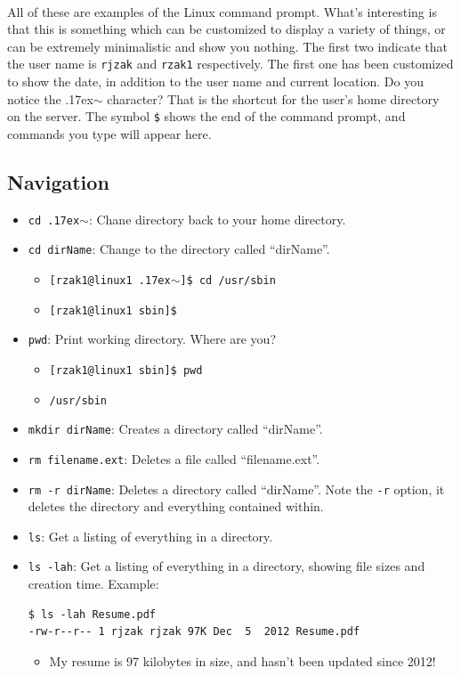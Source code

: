 \documentclass[letter,11pt]{article}
\begin{document}
\paragraph{}All of these are examples of the Linux command prompt. What's interesting is that this is something which can be customized to display a variety of things, or can be extremely minimalistic and show you nothing. The first two indicate that the user name is \texttt{rjzak} and \texttt{rzak1} respectively. The first one has been customized to show the date, in addition to the user name and current location. Do you notice the {\raise.17ex\hbox{$\scriptstyle\sim$}} character? That is the shortcut for the user's home directory on the server. The symbol \texttt{\$} shows the end of the command prompt, and commands you type will appear here.

\subsection{Navigation}
\begin{itemize}
    \item \texttt{cd {\raise.17ex\hbox{$\scriptstyle\sim$}}}: Chane directory back to your home directory.
    \item \texttt{cd dirName}: Change to the directory called ``dirName''.
    \begin{itemize}
        \item \texttt{[rzak1@linux1 {\raise.17ex\hbox{$\scriptstyle\sim$}}]\$ cd /usr/sbin}
        \item \texttt{[rzak1@linux1 sbin]\$}
    \end{itemize}
    \item \texttt{pwd}: Print working directory. Where are you?
    \begin{itemize}
        \item \texttt{[rzak1@linux1 sbin]\$ pwd}
        \item \texttt{/usr/sbin}
    \end{itemize}
    \item \texttt{mkdir dirName}: Creates a directory called ``dirName''.
    \item \texttt{rm filename.ext}: Deletes a file called ``filename.ext''.
    \item \texttt{rm -r dirName}: Deletes a directory called ``dirName''. Note the \texttt{-r} option, it deletes the directory and everything contained within.
    \item \texttt{ls}: Get a listing of everything in a directory.
    \item \texttt{ls -lah}: Get a listing of everything in a directory, showing file sizes and creation time. Example:
    \begin{verbatim}
$ ls -lah Resume.pdf 
-rw-r--r-- 1 rjzak rjzak 97K Dec  5  2012 Resume.pdf\end{verbatim}
    \begin{itemize}
        \item My resume is 97 kilobytes in size, and hasn't been updated since 2012!
    \end{itemize}
\end{itemize}
\end{document}
